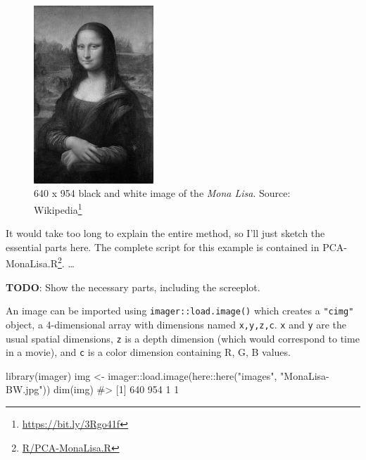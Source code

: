 \documentclass[
  letterpaper,
  10pt,
  krantz2]{krantz}
\makeatletter
\newenvironment{Shaded}{\begin{snugshade}}{\end{snugshade}}
\newcommand{\CommentTok}[1]{\textcolor[rgb]{0.37,0.37,0.37}{#1}}
\newcommand{\FunctionTok}[1]{\textcolor[rgb]{0.28,0.35,0.67}{#1}}
\newcommand{\NormalTok}[1]{\textcolor[rgb]{0.00,0.23,0.31}{#1}}
\newcommand{\OtherTok}[1]{\textcolor[rgb]{0.00,0.23,0.31}{#1}}
\newcommand{\SpecialCharTok}[1]{\textcolor[rgb]{0.37,0.37,0.37}{#1}}
\newcommand{\StringTok}[1]{\textcolor[rgb]{0.13,0.47,0.30}{#1}}
\providecommand{\href}[2]{#2\footnote{\url{#1}}}
\newenvironment{kframe}{%
  \medskip{}
  \setlength{\fboxsep}{.8em}
  \def\at@end@of@kframe{}%
  \ifinner\ifhmode%
  \def\at@end@of@kframe{\end{minipage}}%
  \begin{minipage}{\columnwidth}%
  \fi\fi%
  \def\FrameCommand##1{\hskip\@totalleftmargin \hskip-\fboxsep
  \colorbox{shadecolor}{##1}\hskip-\fboxsep
      \hskip-\linewidth \hskip-\@totalleftmargin \hskip\columnwidth}%
  \MakeFramed {\advance\hsize-\width
    \@totalleftmargin\z@ \linewidth\hsize
    \@setminipage}}%
{\par\unskip\endMakeFramed%
  \at@end@of@kframe}
\renewenvironment{Shaded}{\begin{kframe}}{\end{kframe}}
\makeatother
\begin{document}
\begin{figure}

{\centering \includegraphics[width=0.4\textwidth,height=\textheight]{images/MonaLisa-BW.jpg}

}

\caption{\label{fig-MonaLisa}640 x 954 black and white image of the
\emph{Mona Lisa}. Source: \href{https://bit.ly/3Rgo41f}{Wikipedia}}

\end{figure}

It would take too long to explain the entire method, so I'll just sketch
the essential parts here. The complete script for this example is
contained in \href{R/PCA-MonaLisa.R}{PCA-MonaLisa.R}. \ldots{}

\textbf{TODO}: Show the necessary parts, including the screeplot.

An image can be imported using \texttt{imager::load.image()} which
creates a \texttt{"cimg"} object, a 4-dimensional array with dimensions
named \texttt{x,y,z,c}. \texttt{x} and \texttt{y} are the usual spatial
dimensions, \texttt{z} is a depth dimension (which would correspond to
time in a movie), and \texttt{c} is a color dimension containing R, G, B
values.

\begin{Shaded}
\begin{Highlighting}[]
\FunctionTok{library}\NormalTok{(imager)}
\NormalTok{img }\OtherTok{\textless{}{-}}\NormalTok{ imager}\SpecialCharTok{::}\FunctionTok{load.image}\NormalTok{(here}\SpecialCharTok{::}\FunctionTok{here}\NormalTok{(}\StringTok{"images"}\NormalTok{, }\StringTok{"MonaLisa{-}BW.jpg"}\NormalTok{))}
\FunctionTok{dim}\NormalTok{(img)}
\CommentTok{\#\textgreater{} [1] 640 954   1   1}
\end{Highlighting}
\end{Shaded}
\end{document}
